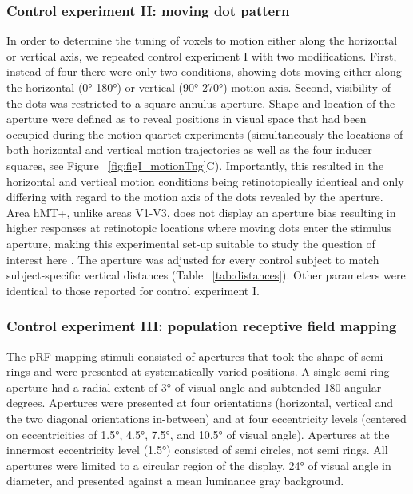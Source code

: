 \subsubsection{Control experiment II: moving dot pattern}
In order to determine the tuning of voxels to motion either along the horizontal or vertical axis, we repeated control experiment I with two modifications. First, instead of four there were only two conditions, showing dots moving either along the horizontal (0°-180°) or vertical (90°-270°) motion axis. Second, visibility of the dots was restricted to a square annulus aperture. Shape and location of the aperture were defined as to reveal positions in visual space that had been occupied during the motion quartet experiments (simultaneously the locations of both horizontal and vertical motion trajectories as well as the four inducer squares, see Figure ~\ref{fig:figI_motionTng}C). Importantly, this resulted in the horizontal and vertical motion conditions being retinotopically identical and only differing with regard to the motion axis of the dots revealed by the aperture. Area hMT+, unlike areas V1-V3, does not display an aperture bias resulting in higher responses at retinotopic locations where moving dots enter the stimulus aperture, making this experimental set-up suitable to study the question of interest here \parencite{Wang2014}. The aperture was adjusted for every control subject to match subject-specific vertical distances (Table ~\ref{tab:distances}). Other parameters were identical to those reported for control experiment I.

\subsubsection{Control experiment III: population receptive field mapping}
The pRF mapping stimuli consisted of apertures that took the shape of semi rings and were presented at systematically varied positions. A single semi ring aperture had a radial extent of 3° of visual angle and subtended 180 angular degrees. Apertures were presented at four orientations (horizontal, vertical and the two diagonal orientations in-between) and at four eccentricity levels (centered on eccentricities of 1.5°, 4.5°, 7.5°, and 10.5° of visual angle). Apertures at the innermost eccentricity level (1.5°) consisted of semi circles, not semi rings. All apertures were limited to a circular region of the display, 24° of visual angle in diameter, and presented against a mean luminance gray background.

